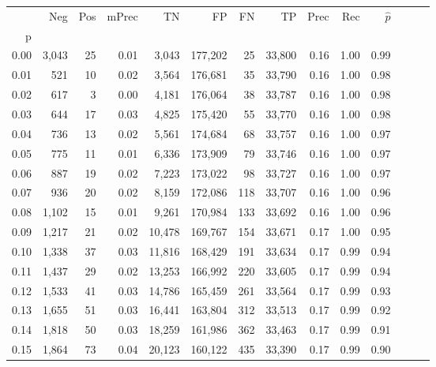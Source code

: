 \begin{tabular}{rrrrrrrrrrrrrr}
\toprule
{} &    Neg &  Pos & mPrec &       TN &       FP &      FN &      TP &  Prec &   Rec & $\hat{p}$ \\
p    &        &      &       &          &          &         &         &       &       &           \\
\midrule
0.00 &  3,043 &   25 &  0.01 &    3,043 &  177,202 &      25 &  33,800 &  0.16 &  1.00 &      0.99 \\
0.01 &    521 &   10 &  0.02 &    3,564 &  176,681 &      35 &  33,790 &  0.16 &  1.00 &      0.98 \\
0.02 &    617 &    3 &  0.00 &    4,181 &  176,064 &      38 &  33,787 &  0.16 &  1.00 &      0.98 \\
0.03 &    644 &   17 &  0.03 &    4,825 &  175,420 &      55 &  33,770 &  0.16 &  1.00 &      0.98 \\
0.04 &    736 &   13 &  0.02 &    5,561 &  174,684 &      68 &  33,757 &  0.16 &  1.00 &      0.97 \\
0.05 &    775 &   11 &  0.01 &    6,336 &  173,909 &      79 &  33,746 &  0.16 &  1.00 &      0.97 \\
0.06 &    887 &   19 &  0.02 &    7,223 &  173,022 &      98 &  33,727 &  0.16 &  1.00 &      0.97 \\
0.07 &    936 &   20 &  0.02 &    8,159 &  172,086 &     118 &  33,707 &  0.16 &  1.00 &      0.96 \\
0.08 &  1,102 &   15 &  0.01 &    9,261 &  170,984 &     133 &  33,692 &  0.16 &  1.00 &      0.96 \\
0.09 &  1,217 &   21 &  0.02 &   10,478 &  169,767 &     154 &  33,671 &  0.17 &  1.00 &      0.95 \\
0.10 &  1,338 &   37 &  0.03 &   11,816 &  168,429 &     191 &  33,634 &  0.17 &  0.99 &      0.94 \\
0.11 &  1,437 &   29 &  0.02 &   13,253 &  166,992 &     220 &  33,605 &  0.17 &  0.99 &      0.94 \\
0.12 &  1,533 &   41 &  0.03 &   14,786 &  165,459 &     261 &  33,564 &  0.17 &  0.99 &      0.93 \\
0.13 &  1,655 &   51 &  0.03 &   16,441 &  163,804 &     312 &  33,513 &  0.17 &  0.99 &      0.92 \\
0.14 &  1,818 &   50 &  0.03 &   18,259 &  161,986 &     362 &  33,463 &  0.17 &  0.99 &      0.91 \\
0.15 &  1,864 &   73 &  0.04 &   20,123 &  160,122 &     435 &  33,390 &  0.17 &  0.99 &      0.90 \\

\end{tabular}
